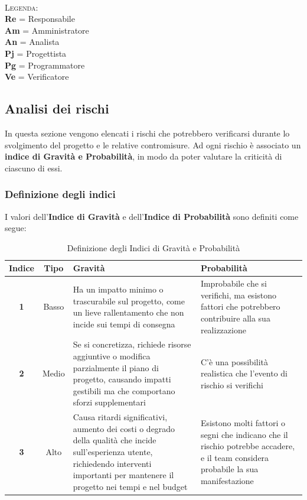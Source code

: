 \documentclass{article}
\begin{document}
        \\
        \textsc{Legenda:} \\
            \textbf{Re} = Responsabile \\
            \textbf{Am} = Amministratore \\
            \textbf{An} = Analista \\
            \textbf{Pj} = Progettista \\
            \textbf{Pg} = Programmatore \\
            \textbf{Ve} = Verificatore \\

    \subsection{Analisi dei rischi}
    In questa sezione vengono elencati i rischi che potrebbero verificarsi durante lo svolgimento del progetto e le relative contromisure. Ad ogni rischio è associato un \textbf{indice di Gravità e Probabilità},
    in modo da poter valutare la criticità di ciascuno di essi.
        \subsubsection{Definizione degli indici}
        I valori dell'\textbf{Indice di Gravità} e dell'\textbf{Indice di Probabilità} sono definiti come segue:
        \begin{table}[h!]
            \centering
            \begin{tabular}{|c|c|p{6cm}|p{6cm}|}
                \hline
                \textbf{Indice} & \textbf{Tipo} & \textbf{Gravità} & \textbf{Probabilità} \\
                \hline
                \textbf{1} & Basso & Ha un impatto minimo o trascurabile sul progetto, come un lieve rallentamento che non incide sui tempi di consegna & Improbabile che si verifichi, ma esistono fattori che potrebbero contribuire alla sua realizzazione \\
                \hline
                \textbf{2} & Medio & Se si concretizza, richiede risorse aggiuntive o modifica parzialmente il piano di progetto, causando impatti gestibili ma che comportano sforzi supplementari & C'è una possibilità realistica che l'evento di rischio si verifichi \\
                \hline
                \textbf{3} & Alto & Causa ritardi significativi, aumento dei costi o degrado della qualità che incide sull'esperienza utente, richiedendo interventi importanti per mantenere il progetto nei tempi e nel budget & Esistono molti fattori o segni che indicano che il rischio potrebbe accadere, e il team considera probabile la sua manifestazione \\
                \hline
            \end{tabular}
            \caption{Definizione degli Indici di Gravità e Probabilità}
            \label{tab:definizione_indici}
        \end{table}
        
\end{document}
